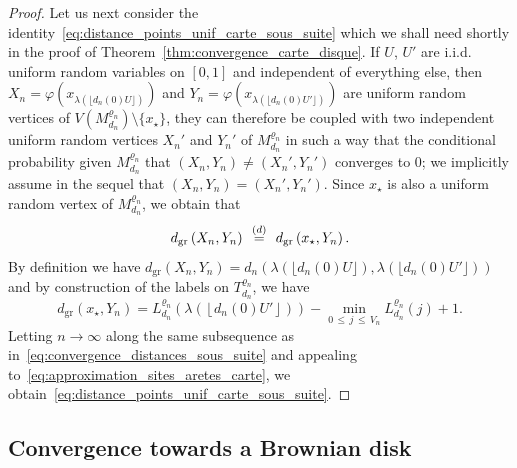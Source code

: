 \documentclass[10pt]{amsart}
\theoremstyle{definition}\newtheorem{defi}[theo]{Definition}\newtheorem{rema}[theo]{Remark}\newtheorem{exam}[theo]{Example}\newtheorem{exem}[theo]{Example}\newtheorem{nota}[theo]{Notation}
\newcommand{\1}{\ensembles{1}}
\renewcommand{\le}{\leqslant}
\newcommand{\mn}{M_{d_n}^{\varrho_n}}
\newcommand{\dgr}{d_{\mathrm{gr}}}
\newcommand{\fn}{T_{d_n}^{\varrho_n}}
\newcommand{\Lfn}{L_{d_n}^{\varrho_n}}
\newcommand{\vertices}{V}
\newcommand{\eqloi}{\enskip\mathop{=}^{(d)}\enskip}
\providecommand{\?}{}
\begin{document}
\begin{proof}
Let us next consider the identity~\eqref{eq:distance_points_unif_carte_sous_suite} which we shall need shortly in the proof of Theorem~\ref{thm:convergence_carte_disque}. If $U$, $U'$ are i.i.d. uniform random variables on $[0,1]$ and independent of everything else, then $X_n = \varphi(x_{\lambda(\lfloor d_n(0) U\rfloor)})$ and $Y_n = \varphi(x_{\lambda(\lfloor d_n(0) U'\rfloor)})$ are uniform random vertices of $V(\mn) \setminus \{x_\star\}$, they can therefore be coupled with two independent uniform random vertices $X_n'$ and $Y_n'$ of $\mn$ in such a way that the conditional probability given $\mn$ that $(X_n,Y_n) \ne (X_n', Y_n')$ converges to $0$; we implicitly assume in the sequel that $(X_n,Y_n) = (X_n', Y_n')$. Since $x_\star$ is also a uniform random vertex of $\mn$, we obtain that
\[
\dgr\left(X_n,Y_n\right) \eqloi \dgr\left(x_\star, Y_n\right).
\]
By definition we have $\dgr(X_n,Y_n) = d_n(\lambda(\lfloor d_n(0) U\rfloor), \lambda(\lfloor d_n(0) U'\rfloor))$ and by construction of the labels on $\fn$, we have
\[
\dgr\left(x_\star, Y_n\right) = \Lfn\left(\lambda\left(\left\lfloor d_n(0) U'\right\rfloor\right)\right) - \min_{0\,\le\,j\,\le\,\vertices_n} \Lfn(j) + 1.
\]
Letting $n \to \infty$ along the same subsequence as in~\eqref{eq:convergence_distances_sous_suite} and appealing to~\eqref{eq:approximation_sites_aretes_carte}, we obtain~\eqref{eq:distance_points_unif_carte_sous_suite}.
\end{proof}



\subsection{Convergence towards a Brownian disk}\label{sec:carte_brownienne}
\end{document}
